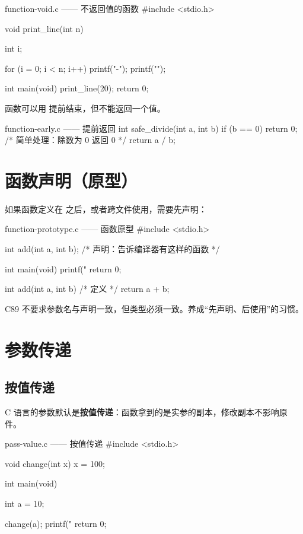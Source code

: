 \begin{codebox}{function-void.c —— 不返回值的函数}
#include <stdio.h>

void print_line(int n)
{
    int i;

    for (i = 0; i < n; i++) {
        printf("-");
    }
    printf("\n");
}

int main(void)
{
    print_line(20);
    return 0;
}
\end{codebox}

 函数可以用  提前结束，但不能返回一个值。

\begin{codebox}{function-early.c —— 提前返回}
int safe_divide(int a, int b)
{
    if (b == 0) {
        return 0;       /* 简单处理：除数为 0 返回 0 */
    }
    return a / b;
}
\end{codebox}

\section{函数声明（原型）}

如果函数定义在  之后，或者跨文件使用，需要先声明：

\begin{codebox}{function-prototype.c —— 函数原型}
#include <stdio.h>

int add(int a, int b);      /* 声明：告诉编译器有这样的函数 */

int main(void)
{
    printf("%
    return 0;
}

int add(int a, int b)       /* 定义 */
{
    return a + b;
}
\end{codebox}

C89 不要求参数名与声明一致，但类型必须一致。养成“先声明、后使用”的习惯。

\section{参数传递}

\subsection{按值传递}

C 语言的参数默认是\textbf{按值传递}：函数拿到的是实参的副本，修改副本不影响原件。

\begin{codebox}{pass-value.c —— 按值传递}
#include <stdio.h>

void change(int x)
{
    x = 100;
}

int main(void)
{
    int a = 10;

    change(a);
    printf("%
    return 0;
}
\end{codebox}


